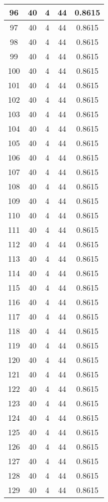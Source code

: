 \documentclass[letterpaper, 12pt]{article}
\begin{document}
\begin{longtable}{|c|c|c|c|c|}
\hline
96 & 40 & 4 & 44 & 0.8615 \\
\hline
97 & 40 & 4 & 44 & 0.8615 \\
\hline
98 & 40 & 4 & 44 & 0.8615 \\
\hline
99 & 40 & 4 & 44 & 0.8615 \\
\hline
100 & 40 & 4 & 44 & 0.8615 \\
\hline
101 & 40 & 4 & 44 & 0.8615 \\
\hline
102 & 40 & 4 & 44 & 0.8615 \\
\hline
103 & 40 & 4 & 44 & 0.8615 \\
\hline
104 & 40 & 4 & 44 & 0.8615 \\
\hline
105 & 40 & 4 & 44 & 0.8615 \\
\hline
106 & 40 & 4 & 44 & 0.8615 \\
\hline
107 & 40 & 4 & 44 & 0.8615 \\
\hline
108 & 40 & 4 & 44 & 0.8615 \\
\hline
109 & 40 & 4 & 44 & 0.8615 \\
\hline
110 & 40 & 4 & 44 & 0.8615 \\
\hline
111 & 40 & 4 & 44 & 0.8615 \\
\hline
112 & 40 & 4 & 44 & 0.8615 \\
\hline
113 & 40 & 4 & 44 & 0.8615 \\
\hline
114 & 40 & 4 & 44 & 0.8615 \\
\hline
115 & 40 & 4 & 44 & 0.8615 \\
\hline
116 & 40 & 4 & 44 & 0.8615 \\
\hline
117 & 40 & 4 & 44 & 0.8615 \\
\hline
118 & 40 & 4 & 44 & 0.8615 \\
\hline
119 & 40 & 4 & 44 & 0.8615 \\
\hline
120 & 40 & 4 & 44 & 0.8615 \\
\hline
121 & 40 & 4 & 44 & 0.8615 \\
\hline
122 & 40 & 4 & 44 & 0.8615 \\
\hline
123 & 40 & 4 & 44 & 0.8615 \\
\hline
124 & 40 & 4 & 44 & 0.8615 \\
\hline
125 & 40 & 4 & 44 & 0.8615 \\
\hline
126 & 40 & 4 & 44 & 0.8615 \\
\hline
127 & 40 & 4 & 44 & 0.8615 \\
\hline
128 & 40 & 4 & 44 & 0.8615 \\
\hline
129 & 40 & 4 & 44 & 0.8615 \\

\end{longtable}
\end{document}
